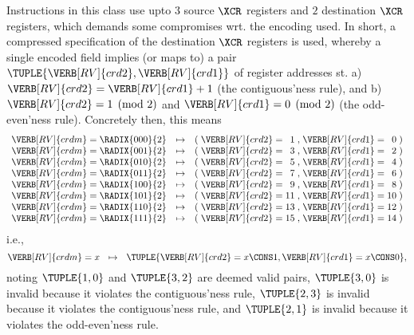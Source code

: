Instructions in this class use upto
$3$ source      $\XCR$ registers
and
$2$ destination $\XCR$ registers,
which demands some compromises wrt. the encoding used.
In short, a compressed specification of the destination $\XCR$ registers is
used, whereby a single encoded  field implies (or maps to) a 
pair 
$
\TUPLE{ \VERB[RV]{crd2}, \VERB[RV]{crd1} }
$
of register addresses st.
a) $\VERB[RV]{crd2} = \VERB[RV]{crd1} + 1$
   (the contiguous'ness rule),
   and
b) $\VERB[RV]{crd2} = 1 \pmod{2}$
   and 
   $\VERB[RV]{crd1} = 0 \pmod{2}$
   (the  odd-even'ness rule).
Concretely then, this means
\[
\begin{array}{l@{\;}c@{\;}r c c@{\;}l@{\;}c@{\;}r@{\;}c@{\;}l@{\;}c@{\;}r@{\;}c}
\VERB[RV]{crdm} &=& \RADIX{000}{2} &\mapsto& ( & \VERB[RV]{crd2} &=&  1 &,& \VERB[RV]{crd1} &=&  0 & ) \\
\VERB[RV]{crdm} &=& \RADIX{001}{2} &\mapsto& ( & \VERB[RV]{crd2} &=&  3 &,& \VERB[RV]{crd1} &=&  2 & ) \\
\VERB[RV]{crdm} &=& \RADIX{010}{2} &\mapsto& ( & \VERB[RV]{crd2} &=&  5 &,& \VERB[RV]{crd1} &=&  4 & ) \\
\VERB[RV]{crdm} &=& \RADIX{011}{2} &\mapsto& ( & \VERB[RV]{crd2} &=&  7 &,& \VERB[RV]{crd1} &=&  6 & ) \\
\VERB[RV]{crdm} &=& \RADIX{100}{2} &\mapsto& ( & \VERB[RV]{crd2} &=&  9 &,& \VERB[RV]{crd1} &=&  8 & ) \\
\VERB[RV]{crdm} &=& \RADIX{101}{2} &\mapsto& ( & \VERB[RV]{crd2} &=& 11 &,& \VERB[RV]{crd1} &=& 10 & ) \\
\VERB[RV]{crdm} &=& \RADIX{110}{2} &\mapsto& ( & \VERB[RV]{crd2} &=& 13 &,& \VERB[RV]{crd1} &=& 12 & ) \\
\VERB[RV]{crdm} &=& \RADIX{111}{2} &\mapsto& ( & \VERB[RV]{crd2} &=& 15 &,& \VERB[RV]{crd1} &=& 14 & ) \\
\end{array}
\]
i.e.,
\[
\VERB[RV]{crdm} = x ~~\mapsto~~ \TUPLE{ \VERB[RV]{crd2} = x \CONS 1 , \VERB[RV]{crd1} = x \CONS 0 } ,
\]
noting
$\TUPLE{ 1, 0 }$ and $\TUPLE{ 3, 2 }$ are deemed valid pairs,
$\TUPLE{ 3, 0 }$ is invalid because it violates the contiguous'ness rule,
$\TUPLE{ 2, 3 }$ is invalid because it violates the contiguous'ness rule,
and
$\TUPLE{ 2, 1 }$ is invalid because it violates the  odd-even'ness rule.



